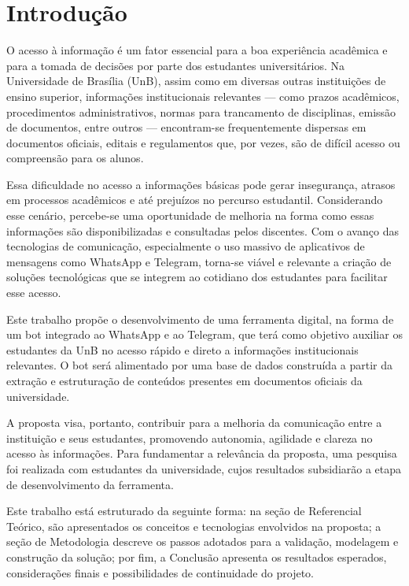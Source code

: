 \chapter[Introdução]{Introdução}

O acesso à informação é um fator essencial para a boa experiência acadêmica e para a tomada de decisões por parte dos estudantes universitários. Na Universidade de Brasília (UnB), assim como em diversas outras instituições de ensino superior, informações institucionais relevantes — como prazos acadêmicos, procedimentos administrativos, normas para trancamento de disciplinas, emissão de documentos, entre outros — encontram-se frequentemente dispersas em documentos oficiais, editais e regulamentos que, por vezes, são de difícil acesso ou compreensão para os alunos.

Essa dificuldade no acesso a informações básicas pode gerar insegurança, atrasos em processos acadêmicos e até prejuízos no percurso estudantil. Considerando esse cenário, percebe-se uma oportunidade de melhoria na forma como essas informações são disponibilizadas e consultadas pelos discentes. Com o avanço das tecnologias de comunicação, especialmente o uso massivo de aplicativos de mensagens como WhatsApp e Telegram, torna-se viável e relevante a criação de soluções tecnológicas que se integrem ao cotidiano dos estudantes para facilitar esse acesso.

Este trabalho propõe o desenvolvimento de uma ferramenta digital, na forma de um bot integrado ao WhatsApp e ao Telegram, que terá como objetivo auxiliar os estudantes da UnB no acesso rápido e direto a informações institucionais relevantes. O bot será alimentado por uma base de dados construída a partir da extração e estruturação de conteúdos presentes em documentos oficiais da universidade.

A proposta visa, portanto, contribuir para a melhoria da comunicação entre a instituição e seus estudantes, promovendo autonomia, agilidade e clareza no acesso às informações. Para fundamentar a relevância da proposta, uma pesquisa foi realizada com estudantes da universidade, cujos resultados subsidiarão a etapa de desenvolvimento da ferramenta.

Este trabalho está estruturado da seguinte forma: na seção de Referencial Teórico, são apresentados os conceitos e tecnologias envolvidos na proposta; a seção de Metodologia descreve os passos adotados para a validação, modelagem e construção da solução; por fim, a Conclusão apresenta os resultados esperados, considerações finais e possibilidades de continuidade do projeto.


